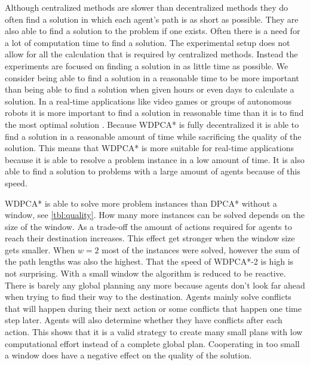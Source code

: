 Although centralized methods are slower than decentralized methods they do often
find a solution in which each agent's path is as short as possible. They are
also able to find a solution to the problem if one exists. Often there is a
need for a lot of computation time to find a solution. The experimental setup
does not allow for all the calculation that is required by centralized methods.
Instead the experiments are focused on finding a solution in as
little time as possible. We consider being able to find a solution in
a reasonable time to be more important than being able to find a solution when
given hours or even days to calculate a solution. In a real-time applications
like video games or groups of autonomous robots it is more important to find a
solution in reasonable time than it is to find the most optimal solution
\citep{botea2013}.
Because WDPCA* is fully decentralized it is able to find a solution in a
reasonable amount of time while sacrificing the quality of the solution. This
means that WDPCA* is more suitable for real-time applications because it is
able to resolve a problem instance in a low amount of time. It is also able to
find a solution to problems with a large amount of agents because of this speed.

WDPCA* is able to solve more problem instances than DPCA* without a window, see
\autoref{tbl:quality}. How many more instances can be solved depends on the
size of the window. As a trade-off the amount of actions required for agents to
reach their destination increases. This effect get stronger when the window
size gets smaller. When $w=2$ most of the instances were solved, however the
sum of the path lengths was also the highest. That the speed of WDPCA*-2 is
high is not surprising. With a small window the algorithm is reduced to be
reactive. There is barely any global planning any more because agents don't
look far ahead when trying to find their way to the destination. Agents mainly
solve conflicts that will happen during their next action or some conflicts
that happen one time step later. Agents will also determine whether they have
conflicts after each action. This shows that it is a valid strategy to create
many small plans with low computational effort instead of a complete global
plan. Cooperating in too small a window does have a negative effect on the
quality of the solution.

